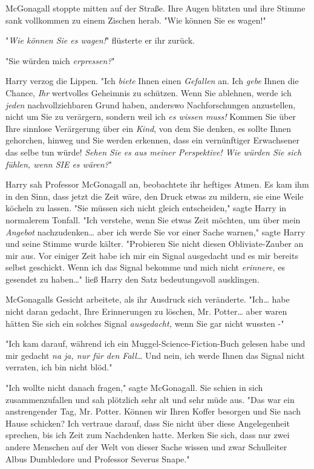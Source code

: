 {McGonagall stoppte mitten auf der Straße. Ihre Augen blitzten und ihre Stimme sank vollkommen zu einem Zischen herab. "Wie können Sie es wagen!"

"\emph{Wie können Sie es wagen!}" flüsterte er ihr zurück.

"Sie würden mich \emph{erpressen?}"

Harry verzog die Lippen. "Ich \emph{biete} Ihnen einen \emph{Gefallen} an. Ich \emph{gebe} Ihnen die Chance, \emph{Ihr} wertvolles Geheimnis zu schützen. Wenn Sie ablehnen, werde ich \emph{jeden} nachvollziehbaren Grund haben, anderswo Nachforschungen anzustellen, nicht um Sie zu verärgern, sondern weil ich \emph{es wissen muss!} Kommen Sie über Ihre sinnlose Verärgerung über ein \emph{Kind}, von dem Sie denken, es sollte Ihnen gehorchen, hinweg und Sie werden erkennen, dass ein vernünftiger Erwachsener das selbe tun würde! \emph{Sehen Sie es aus meiner Perspektive! Wie würden Sie sich fühlen, wenn SIE es wären?}"

Harry sah Professor McGonagall an, beobachtete ihr heftiges Atmen. Es kam ihm in den Sinn, dass jetzt die Zeit wäre, den Druck etwas zu mildern, sie eine Weile köcheln zu lassen. "Sie müssen sich nicht gleich entscheiden," sagte Harry in normalerem Tonfall. "Ich verstehe, wenn Sie etwas Zeit möchten, um über mein \emph{Angebot} nachzudenken… aber ich werde Sie vor einer Sache warnen," sagte Harry und seine Stimme wurde kälter. "Probieren Sie nicht diesen Obliviate-Zauber an mir aus. Vor einiger Zeit habe ich mir ein Signal ausgedacht und es mir bereits selbst geschickt. Wenn ich das Signal bekomme und mich nicht \emph{erinnere,} es gesendet zu haben…" ließ Harry den Satz bedeutungsvoll ausklingen.

McGonagalls Gesicht arbeitete, als ihr Ausdruck sich veränderte. "Ich… habe nicht daran gedacht, Ihre Erinnerungen zu löschen, Mr. Potter… aber waren hätten Sie sich ein solches Signal \emph{ausgedacht,} wenn Sie gar nicht wussten -"

"Ich kam darauf, während ich ein Muggel-Science-Fiction-Buch gelesen habe und mir gedacht \emph{na ja, nur für den Fall…} Und nein, ich werde Ihnen das Signal nicht verraten, ich bin nicht blöd."

"Ich wollte nicht danach fragen," sagte McGonagall. Sie schien in sich zusammenzufallen und sah plötzlich sehr alt und sehr müde aus. "Das war ein anstrengender Tag, Mr. Potter. Können wir Ihren Koffer besorgen und Sie nach Hause schicken? Ich vertraue darauf, dass Sie nicht über diese Angelegenheit sprechen, bis ich Zeit zum Nachdenken hatte. Merken Sie sich, dass nur zwei andere Menschen auf der Welt von dieser Sache wissen und zwar Schulleiter Albus Dumbledore und Professor Severus Snape."

}
